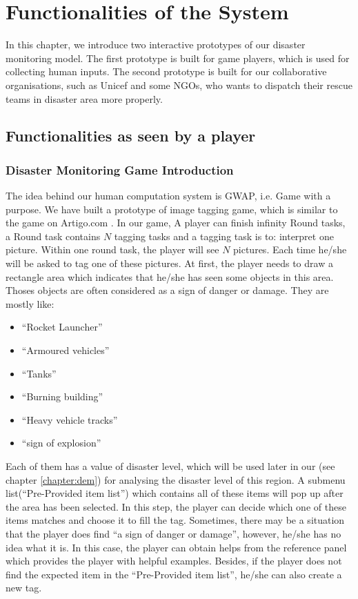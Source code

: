 \section{Functionalities of the System}

In this chapter,
we introduce two interactive prototypes of our disaster monitoring model.
The first prototype is built for game players,
which is used for collecting human inputs.
The second prototype is built for our collaborative organisations,
such as Unicef and some NGOs,
who wants to dispatch their rescue teams in disaster area more properly. 

  \subsection{Functionalities as seen by a player}
      \subsubsection{Disaster Monitoring Game Introduction}
      The idea behind our human computation system is GWAP,
      i.e. Game with a purpose.
      We have built a prototype of image tagging game,
      which is similar to the game on Artigo.com \cite{wieser2013artigo}.
      In our game,
      A player can finish infinity Round tasks, 
      a Round task contains $N$ tagging tasks and a tagging task is to:
      interpret one picture.
      Within one round task, the player will see $N$ pictures.
      Each time he/she will be asked to tag one of these pictures.
      At first,
      the player needs to draw a rectangle area which indicates that he/she has seen some objects in this area.
      Thoses objects are often considered as a sign of danger or damage.
      They are mostly like:
      
      \begin{itemize}
        \item ``Rocket Launcher''
        \item ``Armoured vehicles''
        \item ``Tanks''
        \item ``Burning building''
        \item ``Heavy vehicle tracks''
        \item ``sign of explosion''
      \end{itemize}

      Each of them has a value of disaster level, 
      which will be used later in our (see chapter \ref{chapter:dem}) for analysing the disaster level of this region.
      A submenu list(``Pre-Provided item list'') which contains all of these items will pop up after the area has been selected.
      In this step,
      the player can decide which one of these items matches and choose it to fill the tag.
      Sometimes,
      there may be a situation that the player does find ``a sign of danger or damage'',
      however, he/she has no idea what it is.
      In this case, 
      the player can obtain helps from the reference panel which provides the player with helpful examples.
      Besides, 
      if the player does not find the expected item in the ``Pre-Provided item list'',
      he/she can also create a new tag.

